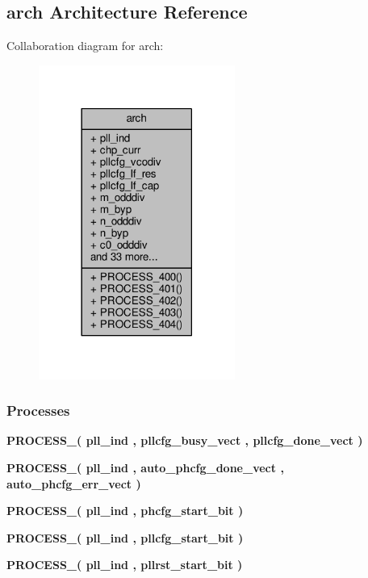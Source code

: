 \subsection{arch Architecture Reference}
\label{classpll__ctrl_1_1arch}


Collaboration diagram for arch\+:\nopagebreak
\begin{figure}[H]
\begin{center}
\leavevmode
\includegraphics[width=182pt]{d7/d24/classpll__ctrl_1_1arch__coll__graph}
\end{center}
\end{figure}
\subsubsection*{Processes}
 \begin{DoxyCompactItemize}
\item 
{\bf P\+R\+O\+C\+E\+S\+S\+\_}{\bfseries  ( {\bfseries {\bfseries {\bf pll\+\_\+ind}} \textcolor{vhdlchar}{ }} , {\bfseries {\bfseries {\bf pllcfg\+\_\+busy\+\_\+vect}} \textcolor{vhdlchar}{ }} , {\bfseries {\bfseries {\bf pllcfg\+\_\+done\+\_\+vect}} \textcolor{vhdlchar}{ }} )}
\item 
{\bf P\+R\+O\+C\+E\+S\+S\+\_}{\bfseries  ( {\bfseries {\bfseries {\bf pll\+\_\+ind}} \textcolor{vhdlchar}{ }} , {\bfseries {\bfseries {\bf auto\+\_\+phcfg\+\_\+done\+\_\+vect}} \textcolor{vhdlchar}{ }} , {\bfseries {\bfseries {\bf auto\+\_\+phcfg\+\_\+err\+\_\+vect}} \textcolor{vhdlchar}{ }} )}
\item 
{\bf P\+R\+O\+C\+E\+S\+S\+\_}{\bfseries  ( {\bfseries {\bfseries {\bf pll\+\_\+ind}} \textcolor{vhdlchar}{ }} , {\bfseries {\bfseries {\bf phcfg\+\_\+start\+\_\+bit}} \textcolor{vhdlchar}{ }} )}
\item 
{\bf P\+R\+O\+C\+E\+S\+S\+\_}{\bfseries  ( {\bfseries {\bfseries {\bf pll\+\_\+ind}} \textcolor{vhdlchar}{ }} , {\bfseries {\bfseries {\bf pllcfg\+\_\+start\+\_\+bit}} \textcolor{vhdlchar}{ }} )}
\item 
{\bf P\+R\+O\+C\+E\+S\+S\+\_}{\bfseries  ( {\bfseries {\bfseries {\bf pll\+\_\+ind}} \textcolor{vhdlchar}{ }} , {\bfseries {\bfseries {\bf pllrst\+\_\+start\+\_\+bit}} \textcolor{vhdlchar}{ }} )}
\end{DoxyCompactItemize}
